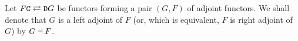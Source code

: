 \begin{notation}
    \label{not:adjoint-functor}
    Let \(F \relax \texttt C \rightleftarrows \texttt D \relax G\) be functors forming a pair
    \((G, F)\) of adjoint functors. We shall denote that \(G\) is a left adjoint of
    \(F\) (or, which is equivalent, \(F\) is right adjoint of \(G\)) by
    \(G \dashv F\).
\end{notation}





